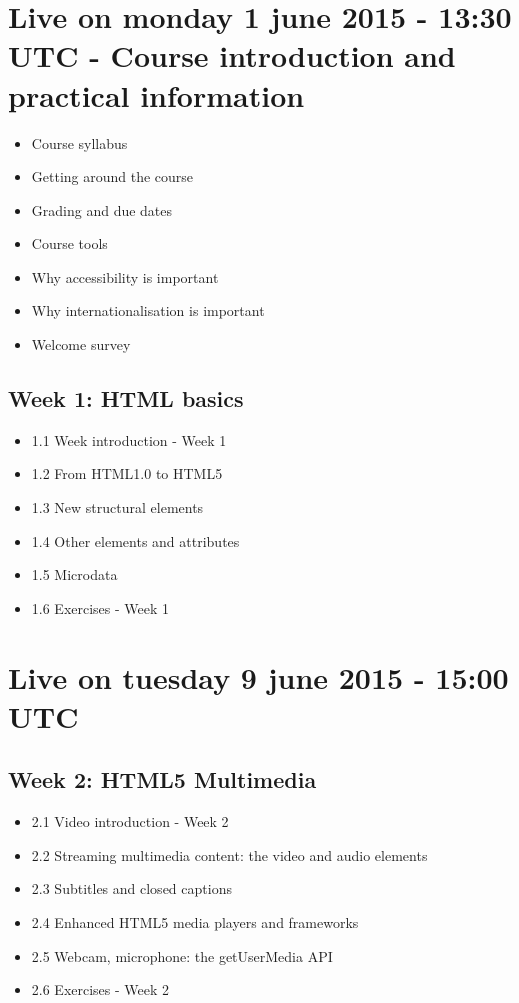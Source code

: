 \documentclass[a4paper,11pt]{book}
\begin{document}
\section{Live on monday 1 june 2015 - 13:30 UTC - Course introduction and practical information}
\begin{itemize}
    \item Course syllabus
    \item Getting around the course
    \item Grading and due dates
    \item Course tools
    \item Why accessibility is important
    \item Why internationalisation is important
    \item Welcome survey
\end{itemize}

    \subsection{Week 1: HTML basics}
    \begin{itemize}
        \item 1.1 Week introduction - Week 1
        \item 1.2 From HTML1.0 to HTML5
        \item 1.3 New structural elements
        \item 1.4 Other elements and attributes
        \item 1.5 Microdata
        \item 1.6 Exercises - Week 1
    \end{itemize}

\section{Live on tuesday 9 june 2015 - 15:00 UTC}
    \subsection{Week 2: HTML5 Multimedia}
    \begin{itemize}
        \item 2.1 Video introduction - Week 2
        \item 2.2 Streaming multimedia content: the video and audio elements
        \item 2.3 Subtitles and closed captions
        \item 2.4 Enhanced HTML5 media players and frameworks
        \item 2.5 Webcam, microphone: the getUserMedia API
        \item 2.6 Exercises - Week 2
    \end{itemize}
\end{document}
